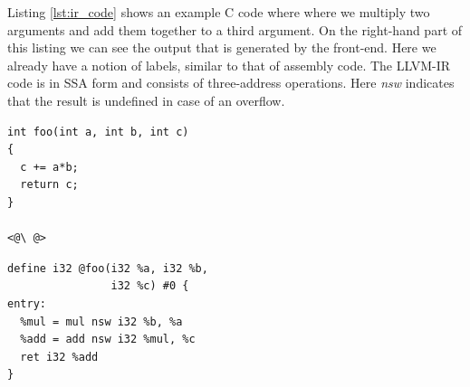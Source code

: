 Listing \ref{lst:ir_code} shows an example C code where where we multiply two arguments and add them together to a third argument. On the right-hand part of this listing we can see the output that is generated by the front-end. Here we already have a notion of labels, similar to that of assembly code. The LLVM-IR code is in SSA form and consists of three-address operations. Here \emph{nsw} indicates that the result is undefined in case of an overflow.

\label{lst:ir_code}
\begin{center}
\hspace{2px}\begin{minipage}{.475\textwidth}
\lstset{style=customc}
\begin{lstlisting}[frame=tlrb]
int foo(int a, int b, int c)
{
  c += a*b;
  return c;
}

<@\ @>
\end{lstlisting}
\end{minipage}\hfill
\begin{minipage}{.475\textwidth}
\lstset{style=customasm}
\begin{lstlisting}[frame=tlrb]
define i32 @foo(i32 %a, i32 %b, 
                i32 %c) #0 {
entry:
  %mul = mul nsw i32 %b, %a
  %add = add nsw i32 %mul, %c
  ret i32 %add
}
\end{lstlisting}
\end{minipage}
\end{center}


